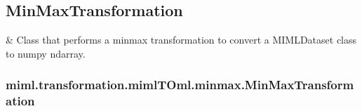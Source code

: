 \documentclass[letterpaper,10pt,english]{sphinxmanual}
\begin{document}
\sphinxstepscope


\subsection{MinMaxTransformation}
\label{\detokenize{transformation/mimlTOml/minmax:minmaxtransformation}}\label{\detokenize{transformation/mimlTOml/minmax::doc}}

\begin{savenotes}\sphinxattablestart
\sphinxthistablewithglobalstyle
\sphinxthistablewithnovlinesstyle
\centering
\begin{tabulary}{\linewidth}[t]{}
\sphinxtoprule
\sphinxtableatstartofbodyhook
\sphinxAtStartPar
{\hyperref[\detokenize{transformation/mimlTOml/_autosummary/miml.transformation.mimlTOml.minmax.MinMaxTransformation:miml.transformation.mimlTOml.minmax.MinMaxTransformation}]{}}
&
\sphinxAtStartPar
Class that performs a minmax transformation to convert a MIMLDataset class to numpy ndarray.
\\
\sphinxbottomrule
\end{tabulary}
\sphinxtableafterendhook\par
\sphinxattableend\end{savenotes}

\sphinxstepscope


\subsubsection{miml.transformation.mimlTOml.minmax.MinMaxTransformation}
\label{\detokenize{transformation/mimlTOml/_autosummary/miml.transformation.mimlTOml.minmax.MinMaxTransformation:miml-transformation-mimltoml-minmax-minmaxtransformation}}\label{\detokenize{transformation/mimlTOml/_autosummary/miml.transformation.mimlTOml.minmax.MinMaxTransformation::doc}}
\end{document}

